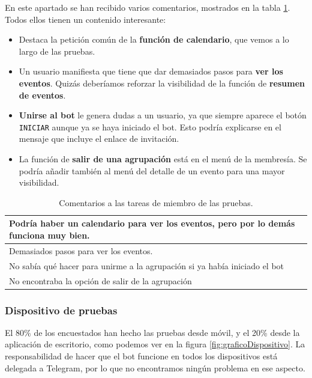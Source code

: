 En este apartado se han recibido varios comentarios, mostrados en la tabla \ref{tab:comentariosTareasMiembro}. Todos ellos tienen un contenido interesante:
\begin{itemize}
    \item Destaca la petición común de la \textbf{función de calendario}, que vemos a lo largo de las pruebas.
    \item Un usuario manifiesta que tiene que dar demasiados pasos para \textbf{ver los eventos}. Quizás deberíamos reforzar la visibilidad de la función de \textbf{resumen de eventos}.
    \item \textbf{Unirse al bot} le genera dudas a un usuario, ya que siempre aparece el botón \texttt{INICIAR} aunque ya se haya iniciado el bot. Esto podría explicarse en el mensaje que incluye el enlace de invitación.
    \item La función de \textbf{salir de una agrupación} está en el menú de la membresía. Se podría añadir también al menú del detalle de un evento para una mayor visibilidad.
\end{itemize}

\begin{table}[h!]
\centering
\begin{tabularx}{\textwidth}{|X|} 
\hline
Podría haber un calendario para ver los eventos, pero por lo demás funciona muy bien. \\
\hline
Demasiados pasos para ver los eventos. \\
\hline
No sabía qué hacer para unirme a la agrupación si ya había iniciado el bot \\
\hline
No encontraba la opción de salir de la agrupación \\
\hline
\end{tabularx}
\caption{Comentarios a las tareas de miembro de las pruebas.}
\label{tab:comentariosTareasMiembro}
\end{table}

\subsubsection{Dispositivo de pruebas}

El 80\% de los encuestados han hecho las pruebas desde móvil, y el 20\% desde la aplicación de escritorio, como podemos ver en la figura \ref{fig:graficoDispositivo}. La responsabilidad de hacer que el bot funcione en todos los dispositivos está delegada a Telegram, por lo que no encontramos ningún problema en ese aspecto.

